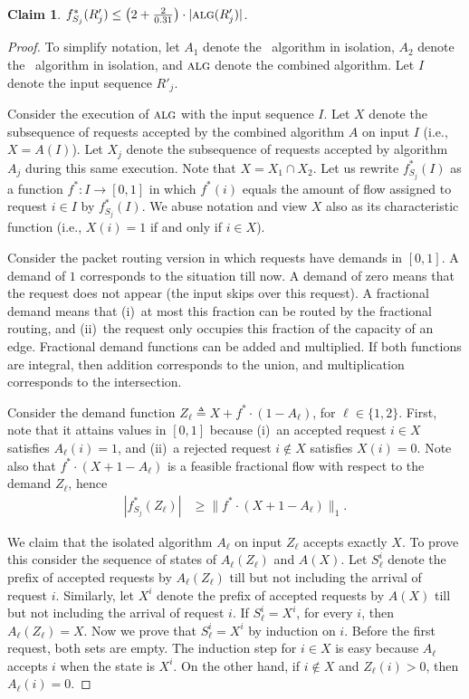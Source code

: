 \documentclass[11pt]{article}
\newtheorem{claim}[theorem]{Claim}
\newcommand{\route}{\text{\sc{ipp}}\xspace}
\newcommand{\IPP}{\route}
\newcommand{\initroute}{\text{\sc{initial-route}}\xspace}
\newcommand{\alg}{\text{\sc{alg}}}
\newenvironment{proof sketch}[1]{\noindent {\emph{Proof sketch of #1:}}}{\hfill \qed}
\def\DEF{\triangleq}
\begin{document}
\begin{claim}\label{claim:combine}
  $f^*_{S_j}(R'_j) \leq \left( 2 + \frac{2}{0.31}\right) \cdot |\alg(R'_j)| $.
\end{claim}
\begin{proof}
  To simplify notation, let $A_1$ denote the \IPP\ algorithm in isolation, $A_2$
  denote the \initroute\ algorithm in isolation, and $\alg$ denote the combined
  algorithm. Let $I$ denote the input sequence $R'_j$.

  Consider the execution of $\alg$ with the input sequence $I$.  Let $X$ denote the
  subsequence of requests accepted by the combined algorithm $A$ on input $I$ (i.e.,
  $X=A(I)$).  Let $X_j$ denote the subsequence of requests accepted by algorithm
  $A_j$ during this same execution. Note that $X=X_1\cap X_2$.  Let us rewrite
  $f^*_{S_j}(I)$ as a function $f^*: I \rightarrow [0,1]$ in which $f^*(i)$ equals
  the amount of flow assigned to request $i\in I$ by $f^*_{S_j}(I)$. We abuse
  notation and view $X$ also as its characteristic function (i.e., $X(i)=1$ if and
  only if $i\in X$).

  Consider the packet routing version in which requests have demands in $[0,1]$. A
  demand of $1$ corresponds to the situation till now. A demand of zero means that
  the request does not appear (the input skips over this request). A fractional
  demand means that (i)~at most this fraction can be routed by the fractional
  routing, and (ii)~the request only occupies this fraction of the capacity of an
  edge. Fractional demand functions can be added and multiplied. If both
  functions are integral, then addition corresponds to the union, and
  multiplication corresponds to the intersection.

  Consider the demand function $Z_{\ell}\DEF X+f^*\cdot (1-A_{\ell})$, for
  $\ell\in\{1,2\}$. First, note that it attains values in $[0,1]$ because (i)~an
  accepted request $i\in X$ satisfies $A_{\ell}(i)=1$, and (ii)~a rejected request
  $i\notin X$ satisfies $X(i)=0$.  Note also that $f^*\cdot (X+1-A_{\ell})$ is a
  feasible fractional flow with respect to the demand $Z_{\ell}$, hence
   \begin{align}
     \label{eq:1}
     |f^*_{S_j}(Z_{\ell})| &\geq \|f^*\cdot (X+1-A_{\ell})\|_1.
   \end{align}

   We claim that the isolated algorithm $A_{\ell}$ on input $Z_{\ell}$ accepts
   exactly $X$.  To prove this consider the sequence of states of
   $A_{\ell}(Z_{\ell})$ and $A(X)$. Let $S^i_{\ell}$ denote the prefix of accepted
   requests by $A_{\ell}(Z_{\ell})$ till but not including the arrival of request
   $i$.  Similarly, let $X^i$ denote the prefix of accepted requests by $A(X)$ till
   but not including the arrival of request $i$. If $S^i_{\ell}=X^i$, for every $i$, then
   $A_{\ell}(Z_{\ell})=X$. Now we prove that $S^i_{\ell}=X^i$ by induction on $i$. Before
   the first request, both sets are empty. The induction step for $i\in X$ is easy
   because $A_{\ell}$ accepts $i$ when the state is $X^i$. On the other hand, if
   $i\notin X$ and $Z_{\ell}(i)>0$, then $A_{\ell}(i)=0$.


\end{proof}
\end{document}
